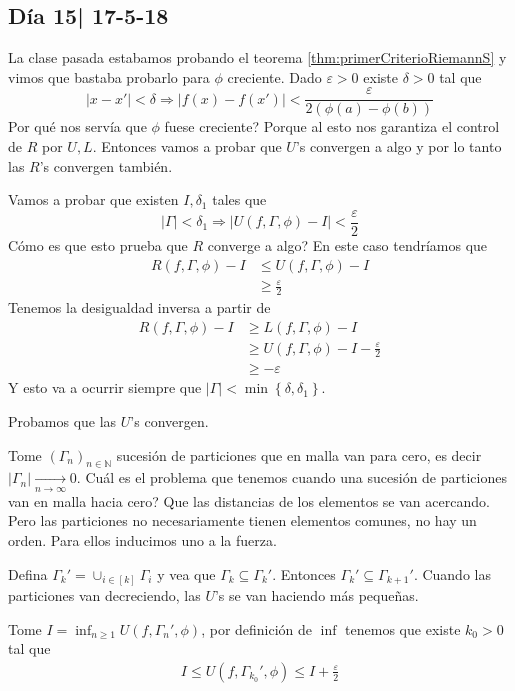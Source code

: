 \documentclass[12pt]{article}
\theoremstyle{plain}
\theoremstyle{definition}
\theoremstyle{remark}
\numberwithin{equation}{section}
\newcommand{\bN}{\mathbb{N}}        %
\renewcommand{\geq}{\geqslant}      %
\renewcommand{\leq}{\leqslant}      %
\renewcommand{\:}{\colon}           %
\newcommand{\conj}[1]{\left\lbrace#1\right\rbrace}
\newcommand{\bonj}[1]{\left\lbrack#1\right\rbrack}
\begin{document}
\begin{multicols}{2}
\subsection{Día 15| 17-5-18}

La clase pasada estabamos probando el teorema \ref{thm:primerCriterioRiemannS} y vimos que bastaba probarlo para $\phi$ creciente. Dado $\varepsilon>0$ existe $\delta>0$ tal que
$$|x-x'|<\delta\Rightarrow|f(x)-f(x')|<\frac{\varepsilon}{2(\phi(a)-\phi(b))}$$
Por qué nos servía que $\phi$ fuese creciente? Porque al esto nos garantiza el control de $R$ por $U,L$. Entonces vamos a probar que $U$'s convergen a algo y por lo tanto las $R$'s convergen también.\par
Vamos a probar que existen $I,\delta_1$ tales que
$$|\Gamma|<\delta_1\Rightarrow |U(f,\Gamma,\phi)-I|<\frac{\varepsilon}{2}$$
Cómo es que esto prueba que $R$ converge a algo? En este caso tendríamos que
\begin{align*}
  R(f,\Gamma,\phi)-I &\leq U(f,\Gamma,\phi)-I\\
  &\geq\frac{\varepsilon}{2}
\end{align*}
Tenemos la desigualdad inversa a partir de
\begin{align*}
  R(f,\Gamma,\phi)-I &\geq L(f,\Gamma,\phi)-I\\
  &\geq U(f,\Gamma,\phi)-I -\frac{\varepsilon}{2}\\
  &\geq -\varepsilon
\end{align*}
Y esto va a ocurrir siempre que $|\Gamma|<\min\conj{\delta,\delta_1}$.\par
Probamos que las $U$'s convergen.
\begin{ptcbp}
Tome $(\Gamma_n)_{n\in\bN}$ sucesión de particiones que en malla van para cero, es decir $|\Gamma_n|\xrightarrow[n\to\infty]{}0$. Cuál es el problema que tenemos cuando una sucesión de particiones van en malla hacia cero? Que las distancias de los elementos se van acercando. Pero las particiones no necesariamente tienen elementos comunes, no hay un orden. Para ellos inducimos uno a la fuerza.\par
Defina $\Gamma_k'=\cup_{i\in\bonj{k}}\Gamma_i$ y vea que $\Gamma_k\subseteq\Gamma_k'$. Entonces $\Gamma_k'\subseteq\Gamma_{k+1}'$. Cuando las particiones van decreciendo, las $U$'s se van haciendo más pequeñas. \par
Tome $I=\inf_{n\geq 1}U(f,\Gamma_n',\phi)$, por definición de $\inf$ tenemos que existe $k_0>0$ tal que
\begin{gather*}
I\leq U(f,\Gamma_{k_0}',\phi)\leq I+\frac{\varepsilon}{2}\\

\end{gather*}
\end{ptcbp}
\end{multicols}
\end{document}

